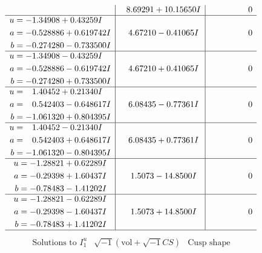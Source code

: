 \documentclass[1p]{elsarticle_modified}
\theoremstyle{definition}
\newcommand{\I}{\sqrt{-1}}
\begin{document}
$$\begin{array}{c|c|c}
 & \phantom{-}8.69291 + 10.15650 I & \phantom{-0.000000 } 0 \\ \hline\begin{aligned}
u &= -1.34908 + 0.43259 I \\
a &= -0.528886 + 0.619742 I \\
b &= -0.274280 - 0.733500 I\end{aligned}
 & \phantom{-}4.67210 - 0.41065 I & \phantom{-0.000000 } 0 \\ \hline\begin{aligned}
u &= -1.34908 - 0.43259 I \\
a &= -0.528886 - 0.619742 I \\
b &= -0.274280 + 0.733500 I\end{aligned}
 & \phantom{-}4.67210 + 0.41065 I & \phantom{-0.000000 } 0 \\ \hline\begin{aligned}
u &= \phantom{-}1.40452 + 0.21340 I \\
a &= \phantom{-}0.542403 - 0.648617 I \\
b &= -1.061320 + 0.804395 I\end{aligned}
 & \phantom{-}6.08435 - 0.77361 I & \phantom{-0.000000 } 0 \\ \hline\begin{aligned}
u &= \phantom{-}1.40452 - 0.21340 I \\
a &= \phantom{-}0.542403 + 0.648617 I \\
b &= -1.061320 - 0.804395 I\end{aligned}
 & \phantom{-}6.08435 + 0.77361 I & \phantom{-0.000000 } 0 \\ \hline\begin{aligned}
u &= -1.28821 + 0.62289 I \\
a &= -0.29398 + 1.60437 I \\
b &= -0.78483 - 1.41202 I\end{aligned}
 & \phantom{-}1.5073 - 14.8500 I & \phantom{-0.000000 } 0 \\ \hline\begin{aligned}
u &= -1.28821 - 0.62289 I \\
a &= -0.29398 - 1.60437 I \\
b &= -0.78483 + 1.41202 I\end{aligned}
 & \phantom{-}1.5073 + 14.8500 I & \phantom{-0.000000 } 0\\
 \hline 
 \end{array}$$\newpage$$\begin{array}{c|c|c}  
\text{Solutions to }I^u_{1}& \I (\text{vol} + \sqrt{-1}CS) & \text{Cusp shape}\\

\end{array}$$
\end{document}
